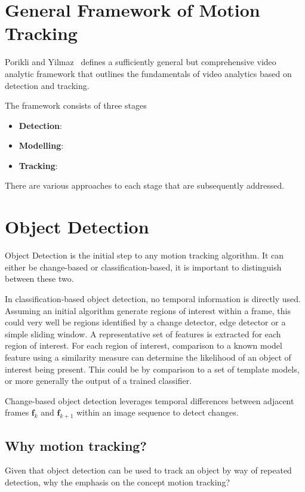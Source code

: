 \section{General Framework of Motion Tracking}
Porikli and Yilmaz~\cite{Porikli2012} defines a sufficiently general but
comprehensive video analytic framework that outlines the fundamentals of video
analytics based on detection and tracking. 

The framework consists of three stages
\begin{itemize}
    \item \textbf{Detection}:
    \item \textbf{Modelling}: 
    \item \textbf{Tracking}:
\end{itemize}

There are various approaches to each stage that are subsequently addressed.

\section{Object Detection}\label{literature_review_object_detection}
Object Detection is the initial step to any motion tracking algorithm. It can
either be change-based or classification-based, it is important to distinguish
between these two.

In classification-based object detection, no temporal information is directly
used. Assuming an initial algorithm generate regions of interest within a frame, this
could very well be regions identified by a change detector, edge detector or a
simple sliding window. A representative set of features is extracted for each
region of interest. For each region of interest, comparison to a known model
feature using a similarity measure can determine the likelihood of an object of
interest being present. 
This could be by comparison to a set of template models, or more generally the
output of a trained classifier.

Change-based object detection leverages temporal differences between adjacent frames
$\mathbf{f}_k$ and $\mathbf{f}_{k+1}$ within an image sequence to detect
changes. 

\subsection{Why motion tracking?}
Given that object detection can be used to track an object by way of repeated
detection, why the emphasis on the concept motion tracking?

